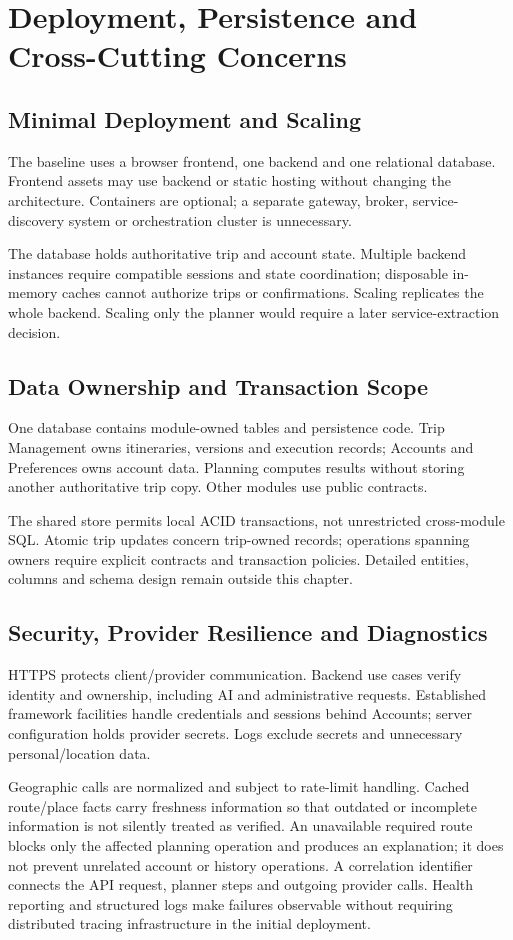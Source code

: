 \section{Deployment, Persistence and Cross-Cutting Concerns}
\subsection{Minimal Deployment and Scaling}
The baseline uses a browser frontend, one backend and one relational database. Frontend assets may use backend or static hosting without changing the architecture. Containers are optional; a separate gateway, broker, service-discovery system or orchestration cluster is unnecessary.

The database holds authoritative trip and account state. Multiple backend instances require compatible sessions and state coordination; disposable in-memory caches cannot authorize trips or confirmations. Scaling replicates the whole backend. Scaling only the planner would require a later service-extraction decision.

\subsection{Data Ownership and Transaction Scope}
One database contains module-owned tables and persistence code. Trip Management owns itineraries, versions and execution records; Accounts and Preferences owns account data. Planning computes results without storing another authoritative trip copy. Other modules use public contracts.

The shared store permits local ACID transactions, not unrestricted cross-module SQL. Atomic trip updates concern trip-owned records; operations spanning owners require explicit contracts and transaction policies. Detailed entities, columns and schema design remain outside this chapter.

\subsection{Security, Provider Resilience and Diagnostics}
HTTPS protects client/provider communication. Backend use cases verify identity and ownership, including AI and administrative requests. Established framework facilities handle credentials and sessions behind Accounts; server configuration holds provider secrets. Logs exclude secrets and unnecessary personal/location data.

Geographic calls are normalized and subject to rate-limit handling. Cached route/place facts carry freshness information so that outdated or incomplete information is not silently treated as verified. An unavailable required route blocks only the affected planning operation and produces an explanation; it does not prevent unrelated account or history operations. A correlation identifier connects the API request, planner steps and outgoing provider calls. Health reporting and structured logs make failures observable without requiring distributed tracing infrastructure in the initial deployment.

